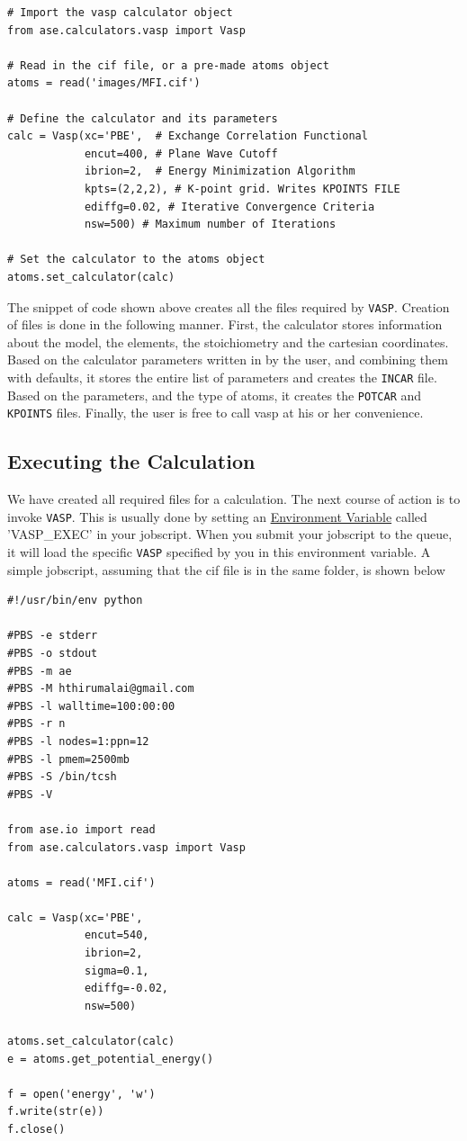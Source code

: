 \documentclass[11pt]{article}
\begin{document}
\begin{verbatim}
# Import the vasp calculator object
from ase.calculators.vasp import Vasp

# Read in the cif file, or a pre-made atoms object
atoms = read('images/MFI.cif')

# Define the calculator and its parameters
calc = Vasp(xc='PBE',  # Exchange Correlation Functional
            encut=400, # Plane Wave Cutoff
            ibrion=2,  # Energy Minimization Algorithm
            kpts=(2,2,2), # K-point grid. Writes KPOINTS FILE
            ediffg=0.02, # Iterative Convergence Criteria
            nsw=500) # Maximum number of Iterations

# Set the calculator to the atoms object
atoms.set_calculator(calc)
\end{verbatim}

The snippet of code shown above creates all the files required by \texttt{VASP}. Creation of files is done in the following manner. First, the calculator stores information about the model, the elements, the stoichiometry and the cartesian coordinates. Based on the calculator parameters written in by the user, and combining them with defaults, it stores the entire list of parameters and creates the \texttt{INCAR} file. Based on the parameters, and the type of atoms, it creates the \texttt{POTCAR} and \texttt{KPOINTS} files. Finally, the user is free to call vasp at his or her convenience. 

\subsection{Executing the Calculation}
\label{sec:org7591e09}
We have created all required files for a calculation. The next course of action is to invoke \texttt{VASP}. This is usually done by setting an \href{https://en.wikipedia.org/wiki/Environment_variable}{Environment Variable} called 'VASP\_EXEC' in your jobscript. When you submit your jobscript to the queue, it will load the specific \texttt{VASP} specified by you in this environment variable. A simple jobscript, assuming that the cif file is in the same folder, is shown below

\begin{verbatim}
#!/usr/bin/env python

#PBS -e stderr
#PBS -o stdout
#PBS -m ae
#PBS -M hthirumalai@gmail.com
#PBS -l walltime=100:00:00
#PBS -r n
#PBS -l nodes=1:ppn=12
#PBS -l pmem=2500mb
#PBS -S /bin/tcsh
#PBS -V

from ase.io import read
from ase.calculators.vasp import Vasp

atoms = read('MFI.cif')

calc = Vasp(xc='PBE',
            encut=540,
            ibrion=2,
            sigma=0.1,
            ediffg=-0.02,
            nsw=500)

atoms.set_calculator(calc)
e = atoms.get_potential_energy()

f = open('energy', 'w')
f.write(str(e))
f.close()
\end{verbatim}
\end{document}
